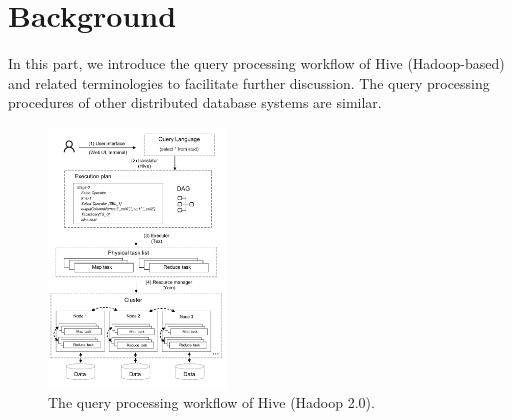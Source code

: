 \section{Background}\label{sec:background}



In this part, we introduce the query processing workflow of Hive (Hadoop-based) and related terminologies to facilitate further discussion. The query processing procedures of other distributed database systems are similar.  

\begin{figure}[t]
	\centering
	\includegraphics[width=0.42\textwidth]{figures/background/background.pdf}
	\vspace{-3mm}
	\caption{The query processing workflow of Hive (Hadoop 2.0).}
	\label{fig:architecture}
	\vspace{-3mm}
\end{figure}


